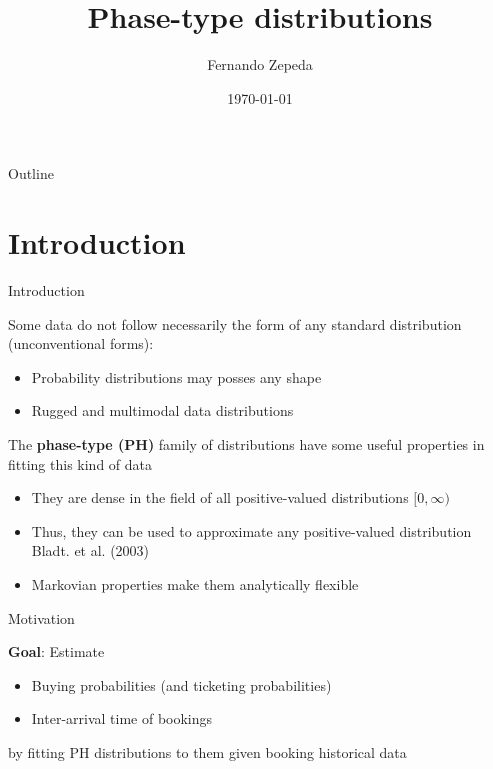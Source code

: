 \documentclass[envcountset]{beamer}
\title[PH Distributions]{Phase-type distributions}
\subtitle{}
\author{Fernando Zepeda}
\institute{TU Berlin - Lufthansa Systems}
\date{\today}
\theoremstyle{definition}
\begin{document}
\begin{frame}
  \titlepage


\end{frame}

\begin{frame}{Outline}
  \tableofcontents
\end{frame}

\section{Introduction}

\begin{frame}{Introduction}

Some data do not follow necessarily the form of any standard distribution (unconventional forms):
	\begin{itemize}
	\item Probability distributions may posses any shape
	\item Rugged and multimodal data distributions
	\end{itemize}

\vspace{0.3cm}

The \textbf{phase-type (PH)} family of distributions have some useful properties in fitting this kind of data
	\begin{itemize}
	\item They are dense in the field of all positive-valued distributions $[ 0,\infty)$
	\item Thus, they can be used to approximate any positive-valued distribution Bladt. et al. (2003)
	\item Markovian properties make them analytically flexible
	\end{itemize}

\end{frame}
\begin{frame}{Motivation}

\textbf{Goal}: 
Estimate
\begin{itemize}
\item Buying probabilities (and ticketing probabilities)
\item Inter-arrival time of bookings
\end{itemize}

by fitting PH distributions to them given booking historical data 

\end{frame}
\end{document}
